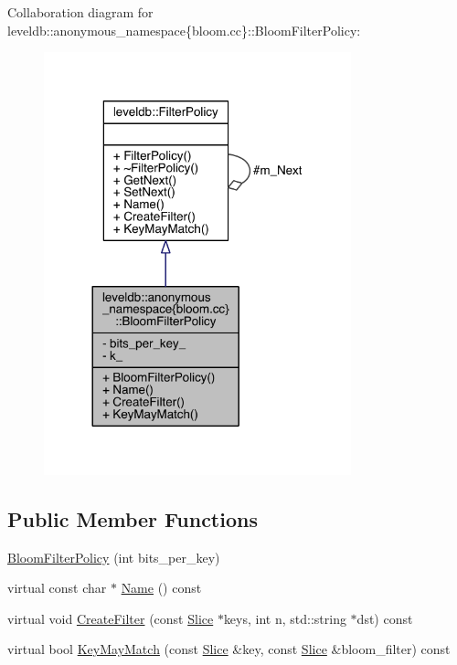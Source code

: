 Collaboration diagram for leveldb\+:\+:anonymous\+\_\+namespace\{bloom.\+cc\}\+:\+:Bloom\+Filter\+Policy\+:
\nopagebreak
\begin{figure}[H]
\begin{center}
\leavevmode
\includegraphics[width=252pt]{classleveldb_1_1anonymous__namespace_02bloom_8cc_03_1_1_bloom_filter_policy__coll__graph}
\end{center}
\end{figure}
\subsection*{Public Member Functions}
\begin{DoxyCompactItemize}
\item 
\hyperlink{classleveldb_1_1anonymous__namespace_02bloom_8cc_03_1_1_bloom_filter_policy_a9fc142e1d54de78c0e15e786ab193b0b}{Bloom\+Filter\+Policy} (int bits\+\_\+per\+\_\+key)
\item 
virtual const char $\ast$ \hyperlink{classleveldb_1_1anonymous__namespace_02bloom_8cc_03_1_1_bloom_filter_policy_a87de3b693cf325272fb71470974bfa16}{Name} () const 
\item 
virtual void \hyperlink{classleveldb_1_1anonymous__namespace_02bloom_8cc_03_1_1_bloom_filter_policy_a3d6aa8601d9ade9f9a9947569aef971c}{Create\+Filter} (const \hyperlink{classleveldb_1_1_slice}{Slice} $\ast$keys, int n, std\+::string $\ast$dst) const 
\item 
virtual bool \hyperlink{classleveldb_1_1anonymous__namespace_02bloom_8cc_03_1_1_bloom_filter_policy_a4a275f6feda978ae46af1ea0ffc34a5f}{Key\+May\+Match} (const \hyperlink{classleveldb_1_1_slice}{Slice} \&key, const \hyperlink{classleveldb_1_1_slice}{Slice} \&bloom\+\_\+filter) const 
\end{DoxyCompactItemize}
